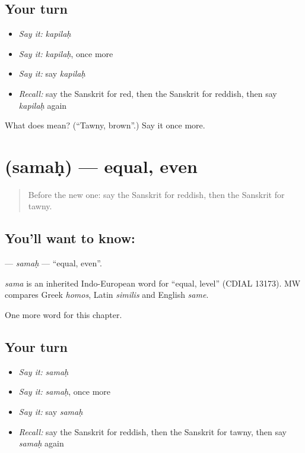 \subsection*{Your turn}
\begin{itemize}
\raggedright
  \item \emph{Say it:} \emph{kapilaḥ}
  \item \emph{Say it:} \emph{kapilaḥ}, once more
  \item \emph{Say it:} say \emph{kapilaḥ}
  \item \emph{Recall:} say the Sanskrit for red, then the Sanskrit for reddish, then say \emph{kapilaḥ} again
\end{itemize}

\begin{tcolorbox}[breakable,colback=teal!4,colframe=teal!35!black,title={Before you move on}]
What does  mean? (\textquotedblleft{}Tawny, brown\textquotedblright{}.) Say it once more.
\end{tcolorbox}
\section[\texorpdfstring{\sk{समः} (samaḥ)}{समः (samaḥ)}]{ (samaḥ) — equal, even}

\label{lesson:SA-C217-samah}



\begin{quote}
Before the new one: say the Sanskrit for reddish, then the Sanskrit for tawny.
\end{quote}

\subsection*{You'll want to know: }
\textbf{} — \emph{samaḥ} — \textquotedblleft{}equal, even\textquotedblright{}.

\begin{cousinweb}
\emph{sama} is an inherited Indo-European word for \textquotedblleft{}equal, level\textquotedblright{} (CDIAL 13173). MW compares Greek \emph{homos}, Latin \emph{similis} and English \emph{same}.
\end{cousinweb}

\begin{grammarlens}[title={What you've built}]
One more word for this chapter.
\end{grammarlens}

\subsection*{Your turn}
\begin{itemize}
\raggedright
  \item \emph{Say it:} \emph{samaḥ}
  \item \emph{Say it:} \emph{samaḥ}, once more
  \item \emph{Say it:} say \emph{samaḥ}
  \item \emph{Recall:} say the Sanskrit for reddish, then the Sanskrit for tawny, then say \emph{samaḥ} again
\end{itemize}

